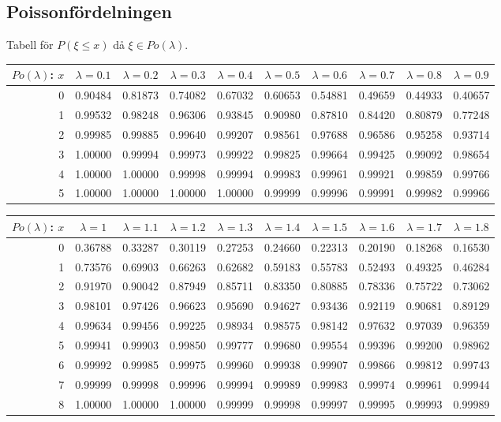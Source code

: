 \subsection*{Poissonfördelningen}

Tabell för $P(\xi\le x)$ då $\xi\in Po(\lambda)$.

\medskip\begin{tabular}{|r|c|c|c|c|c|c|c|c|c|}
\hline
$Po(\lambda)$: $x$
   & $\lambda=0.1$ & $\lambda=0.2$ & $\lambda=0.3$ & $\lambda=0.4$ & $\lambda=0.5$ & $\lambda=0.6$ & $\lambda=0.7$ & $\lambda=0.8$ & $\lambda=0.9$ \\\hline
  0&0.90484&0.81873&0.74082&0.67032&0.60653&0.54881&0.49659&0.44933&0.40657\\
  1&0.99532&0.98248&0.96306&0.93845&0.90980&0.87810&0.84420&0.80879&0.77248\\
  2&0.99985&0.99885&0.99640&0.99207&0.98561&0.97688&0.96586&0.95258&0.93714\\
  3&1.00000&0.99994&0.99973&0.99922&0.99825&0.99664&0.99425&0.99092&0.98654\\
  4&1.00000&1.00000&0.99998&0.99994&0.99983&0.99961&0.99921&0.99859&0.99766\\
  5&1.00000&1.00000&1.00000&1.00000&0.99999&0.99996&0.99991&0.99982&0.99966\\
\hline
\end{tabular}

\vspace{8pt minus 6pt}
\begin{tabular}{|r|c|c|c|c|c|c|c|c|c|}
\hline
$Po(\lambda)$: $x$
   & $\lambda=1$ & $\lambda=1.1$ & $\lambda=1.2$ & $\lambda=1.3$ & $\lambda=1.4$ & $\lambda=1.5$ & $\lambda=1.6$ & $\lambda=1.7$ & $\lambda=1.8$ \\\hline
  0&0.36788&0.33287&0.30119&0.27253&0.24660&0.22313&0.20190&0.18268&0.16530\\
  1&0.73576&0.69903&0.66263&0.62682&0.59183&0.55783&0.52493&0.49325&0.46284\\
  2&0.91970&0.90042&0.87949&0.85711&0.83350&0.80885&0.78336&0.75722&0.73062\\
  3&0.98101&0.97426&0.96623&0.95690&0.94627&0.93436&0.92119&0.90681&0.89129\\
  4&0.99634&0.99456&0.99225&0.98934&0.98575&0.98142&0.97632&0.97039&0.96359\\
  5&0.99941&0.99903&0.99850&0.99777&0.99680&0.99554&0.99396&0.99200&0.98962\\
  6&0.99992&0.99985&0.99975&0.99960&0.99938&0.99907&0.99866&0.99812&0.99743\\
  7&0.99999&0.99998&0.99996&0.99994&0.99989&0.99983&0.99974&0.99961&0.99944\\
  8&1.00000&1.00000&1.00000&0.99999&0.99998&0.99997&0.99995&0.99993&0.99989\\
\hline
\end{tabular}

